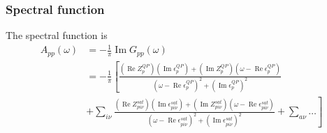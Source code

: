 \begin{frame}
    \frametitle{Spectral function}
The spectral function is
\begin{align}
    A_{pp}(\omega) &= -\frac{1}{\pi} \operatorname{Im} G_{pp}(\omega) \\
&=-\frac{1}{\pi}\left[\frac{\left(\operatorname{Re} Z_p^{QP}\right)\left(\operatorname{Im} \epsilon_p^{QP}\right) + \left(\operatorname{Im} Z_p^{QP}\right)\left(\omega - \operatorname{Re} \epsilon_p^{QP}\right)}{\left(\omega - \operatorname{Re} \epsilon_p^{QP}\right)^2 + \left(\operatorname{Im} \epsilon_p^{QP}\right)^2}\right.\\
& \left. + \sum_{i\nu} \frac{\left(\operatorname{Re} Z_{pi\nu}^{sat}\right)\left(\operatorname{Im} \epsilon_{pi\nu}^{sat}\right) + \left(\operatorname{Im} Z_{pi\nu}^{sat}\right)\left(\omega - \operatorname{Re} \epsilon_{pi\nu}^{sat}\right)}{\left(\omega - \operatorname{Re} \epsilon_{pi\nu}^{sat}\right)^2 + \left(\operatorname{Im} \epsilon_{pi\nu}^{sat}\right)^2} + \sum_{a\nu}\ldots \right]
\end{align}

\end{frame}
